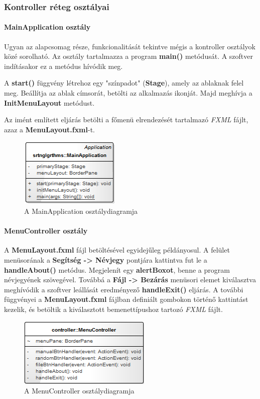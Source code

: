 \documentclass{elteikthesis}
\begin{document}
\subsubsection{Kontroller réteg osztályai}
\paragraph{MainApplication osztály}
Ugyan az alapcsomag része, funkcionalitását tekintve mégis a kontroller osztályok közé sorolható. Az osztály tartalmazza a program \textbf{main()} metódusát. A szoftver indításakor ez a metódus hívódik meg.\par
A \textbf{start()} függvény létrehoz egy "színpadot" (\textbf{Stage}), amely az ablaknak felel meg. Beállítja az ablak címsorát, betölti az alkalmazás ikonját. Majd meghívja a \textbf{InitMenuLayout} metódust.\par
Az imént említett eljárás betölti a főmenü elrendezését tartalmazó \emph{FXML} fájlt, azaz a \textbf{MenuLayout.fxml}-t.
\begin{figure}[H]
	\centering
	\includegraphics{pics/class/MainApplication.png}
	\caption{A MainApplication osztálydiagramja}
\end{figure}
\paragraph{MenuController osztály}
A \textbf{MenuLayout.fxml} fájl betöltésével egyidejűleg példányosul. A felület menüsorának a \textbf{Segítség -> Névjegy} pontjára kattintva fut le a \textbf{handleAbout()} metódus. Megjelenít egy \textbf{alertBoxot}, benne a program névjegyének szövegével. Továbbá a \textbf{Fájl -> Bezárás} menüsori elemet kiválasztva meghívódik a szoftver leállását eredményező \textbf{handleExit()} eljárás. A további függvényei a \textbf{MenuLayout.fxml} fájlban definiált gombokon történő kattintást kezelik, és betöltik a kiválasztott bemenettípushoz tartozó \emph{FXML} fájlt.
\begin{figure}[H]
	\centering
	\includegraphics{pics/class/MenuController.png}
	\caption{A MenuController osztálydiagramja}
\end{figure}
\end{document}
